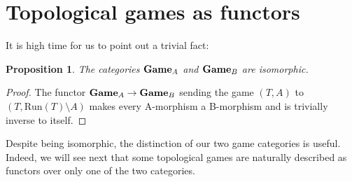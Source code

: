 \documentclass[12pt]{amsart}
\newtheorem{prop}[thm]{Proposition}
\theoremstyle{definition}
\newcommand{\A}{\textup{\textmd{\textsc{A}}}}
\newcommand{\B}{\textup{\textmd{\textsc{B}}}}
\newcommand{\Run}{{\mathrm{Run}}}
\newcommand{\Games}{\mathbf{Game}}
\begin{document}
\section{Topological games as functors}\label{SEC_TopGames}
It is high time for us to point out a trivial fact:
\begin{prop}\label{PROP_EquivCat}
	The categories $\Games_\A$ and $\Games_\B$ are isomorphic.
\end{prop}
\begin{proof}
	The functor $\Games_\A \stackrel{}{\to}\Games_\B$  sending the game $(T,A)$	to $(T,\Run(T)\setminus A)$ makes every A-morphism a B-morphism and is trivially inverse to itself.	
\end{proof}


Despite being isomorphic, the distinction of our two game categories is useful. Indeed, we will see next that some topological games are naturally described as functors over only one of the two categories.
\end{document}
